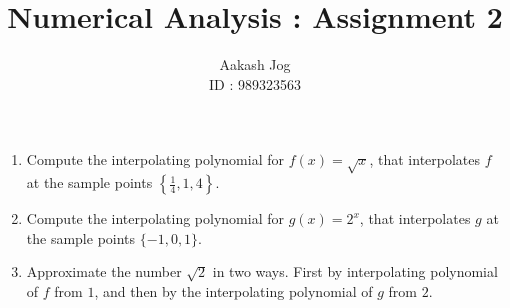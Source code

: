 \documentclass[fleqn, a4paper, 11pt, oneside]{amsart}
\title{Numerical Analysis : Assignment 2}
\author
{
	Aakash Jog\\
	ID : 989323563
}
\date{\formatdate{27}{10}{2015}}
\theoremstyle{definition}
\theoremstyle{theorem}
\begin{document}

\maketitle

\begin{question}
	\begin{enumerate}
		\item
			Compute the interpolating polynomial for $f(x) = \sqrt{x}$, that interpolates $f$ at the sample points $\left\{ \frac{1}{4} , 1 , 4 \right\}$.
		\item
			Compute the interpolating polynomial for $g(x) = 2^x$, that interpolates $g$ at the sample points $\{-1,0,1\}$.
		\item
			Approximate the number $\sqrt{2}$ in two ways.
			First by interpolating polynomial of $f$ from $1$, and then by the interpolating polynomial of $g$ from $2$.
	\end{enumerate}
\end{question}
\end{document}
